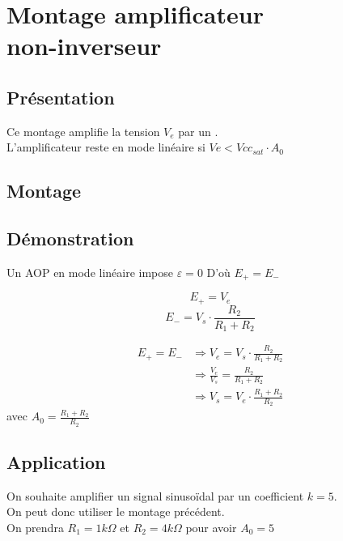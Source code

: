 


\chapter{Montage amplificateur \\non-inverseur }


\section{Présentation}

Ce montage amplifie la tension $V_e$ par un . \\
L’amplificateur reste en mode linéaire si $Ve < Vcc_{sat} \cdot A_0$

\section{Montage}


\section{Démonstration }

Un AOP en mode linéaire impose $\varepsilon=0$
D'où $E_+ =E_-$ 

$$E_+=V_e$$
$$E_-=V_s \cdot \frac{R_2}{R_1+R_2}$$

\begin{align}
E_+ = E_- &\Rightarrow V_e = V_s \cdot \frac{R_2}{R_1+R_2}\\
 &\Rightarrow \frac{V_e}{V_s} = \frac{R_2}{R_1+R_2}\\
 &\Rightarrow V_s = V_e \cdot \frac{R_1+R_2}{R_2}
\end{align}
avec $A_0=\frac{R_1+R_2}{R_2}$

\section{Application}

\begin{exemple}
On souhaite amplifier un signal sinusoïdal par un coefficient $k=5$.\\
On peut donc utiliser le montage précédent. \\
On prendra $R_1=1 k\Omega$ et $R_2=4k\Omega$ pour avoir $A_0=5$
\end{exemple}


